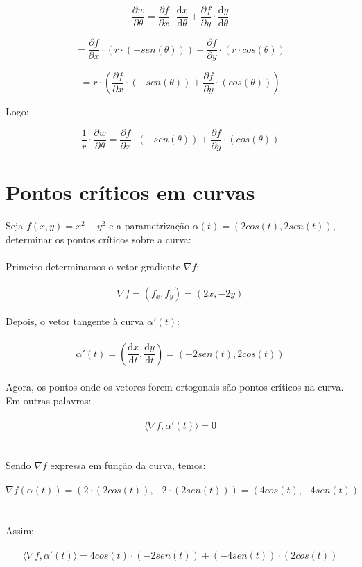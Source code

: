 \documentclass[11pt]{article}
\begin{document}
$$\frac{\partial w}{\partial \theta} = \frac{\partial f}{\partial x} \cdot \frac{\mathrm{d} x}{\mathrm{d} \theta} + \frac{\partial f}{\partial y} \cdot \frac{\mathrm{d} y}{\mathrm{d} \theta}$$

$$= \frac{\partial f}{\partial x} \cdot (r \cdot (-sen(\theta))) + \frac{\partial f}{\partial y} \cdot (r \cdot cos(\theta))$$

$$= r \cdot \left(\frac{\partial f}{\partial x} \cdot (-sen(\theta)) + \frac{\partial f}{\partial y} \cdot (cos(\theta))\right)$$

Logo:

$$ \frac{1}{r} \cdot \frac{\partial w}{\partial \theta} = \frac{\partial f}{\partial x} \cdot (-sen(\theta)) + \frac{\partial f}{\partial y} \cdot (cos(\theta))$$

\section{Pontos críticos em curvas}

Seja $f(x, y) = x^2 - y^2$ e a parametrização $\alpha(t) = (2cos(t), 2sen(t))$, determinar os pontos críticos sobre a curva:\\
\\
Primeiro determinamos o vetor gradiente $\nabla f$:\\
\\
$$\nabla f = (f_x, f_y) = (2x, -2y)$$
\\
Depois, o vetor tangente à curva $\alpha'(t)$:\\
\\
$$\alpha'(t) = \left(\frac{\mathrm{d} x}{\mathrm{d} t}, \frac{\mathrm{d} y}{\mathrm{d} t}\right) = (-2sen(t), 2cos(t))$$
\\
Agora, os pontos onde os vetores forem ortogonais são pontos críticos na curva. Em outras palavras:\\
\\
$$\langle \nabla f, \alpha'(t) \rangle = 0$$\\
\\
Sendo $\nabla f$ expressa em função da curva, temos:\\
\\
$$\nabla f (\alpha(t)) = (2 \cdot (2cos(t)), -2 \cdot (2sen(t))) = (4cos(t), -4sen(t))$$\\
\\
Assim:\\
\\
$$\langle \nabla f, \alpha'(t) \rangle = 4cos(t) \cdot (-2sen(t)) + (-4sen(t)) \cdot (2cos(t))$$
\end{document}
